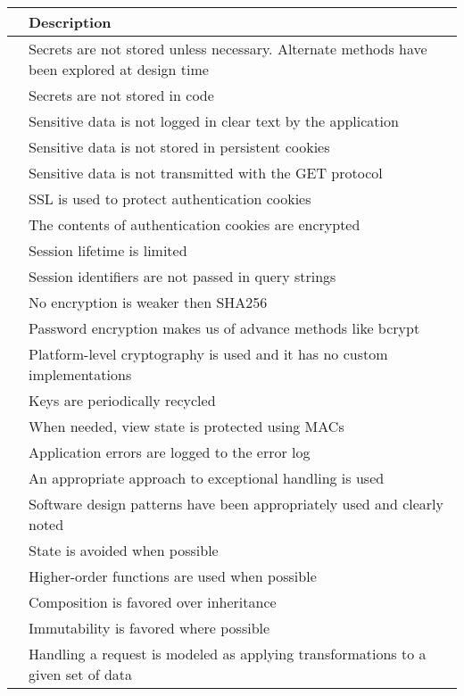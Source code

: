 \documentclass{article}
\begin{document}
\begin{center}
    \begin{tabular}{ | p{.25cm} || p{10cm} |}
    \hline
     & Description \\ \hline
     & Secrets are not stored unless necessary. Alternate methods have been explored at design time \\ \hline
     & Secrets are not stored in code \\ \hline
     & Sensitive data is not logged in clear text by the application \\ \hline
     & Sensitive data is not stored in persistent cookies \\ \hline
     & Sensitive data is not transmitted with the GET protocol \\ \hline
     & SSL is used to protect authentication cookies \\ \hline
     & The contents of authentication cookies are encrypted \\ \hline
     & Session lifetime is limited \\ \hline
     & Session identifiers are not passed in query strings \\ \hline
     & No encryption is weaker then SHA256 \\ \hline
     & Password encryption makes us of advance methods like bcrypt \\ \hline
     & Platform-level cryptography is used and it has no custom implementations \\ \hline
     & Keys are periodically recycled \\ \hline
     & When needed, view state is protected using MACs \\ \hline
     & Application errors are logged to the error log \\ \hline
     & An appropriate approach to exceptional handling is used \\ \hline
     & Software design patterns have been appropriately used and clearly noted \\ \hline
     & State is avoided when possible \\ \hline
     & Higher-order functions are used when possible \\ \hline
     & Composition is favored over inheritance \\ \hline
     & Immutability is favored where possible \\ \hline
     & Handling a request is modeled as applying transformations to a given set of data \\ \hline
    \end{tabular}
\end{center}
\end{document}
